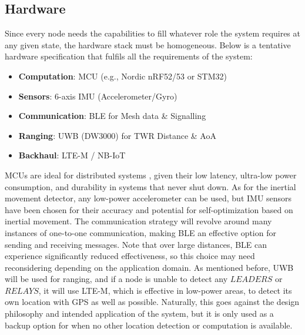 \subsection{Hardware}
\noindent Since every node needs the capabilities to fill whatever role the system requires at any given state, the hardware stack must be homogeneous. Below is a tentative hardware specification that fulfils all the requirements of the system:
\begin{itemize}
    \item \textbf{Computation}: MCU (e.g., Nordic nRF52/53 or STM32)
    \item \textbf{Sensors}: 6-axis IMU (Accelerometer/Gyro)
    \item \textbf{Communication}: BLE for Mesh data \& Signalling
    \item \textbf{Ranging}: UWB (DW3000) for TWR Distance \& AoA
    \item \textbf{Backhaul}: LTE-M / NB-IoT
\end{itemize}
MCUs are ideal for distributed systems \cite{MicrocontrollerUnit-BasedWirelessSensorNetworkNodes:AReview}, given their low latency, ultra-low power consumption, and durability in systems that never shut down. As for the inertial movement detector, any low-power accelerometer can be used, but IMU sensors have been chosen for their accuracy and potential for self-optimization based on inertial movement. The communication strategy will revolve around many instances of one-to-one communication, making BLE an effective option for sending and receiving messages. Note that over large distances, BLE can experience significantly reduced effectiveness, so this choice may need reconsidering depending on the application domain. As mentioned before, UWB will be used for ranging, and if a node is unable to detect any $LEADERS$ or $RELAYS$, it will use LTE-M, which is effective in low-power areas, to detect its own location with GPS as well as possible. Naturally, this goes against the design philosophy and intended application of the system, but it is only used as a backup option for when no other location detection or computation is available.

